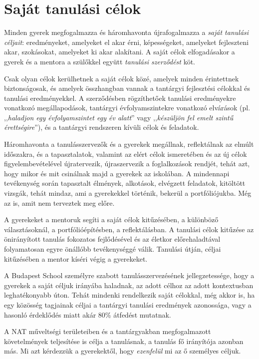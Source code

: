 \section{Saját tanulási célok}
\label{sec:tanulasi_celok}

Minden gyerek megfogalmazza és háromhavonta újrafogalmazza a \emph{saját tanulási céljait}: eredményeket, amelyeket el akar érni, képességeket, amelyeket fejleszteni akar, szokásokat, amelyeket ki akar alakítani. A saját célok elfogadásakor a gyerek és a mentora a szülőkkel együtt \emph{tanulási szerződést} köt.

Csak olyan célok kerülhetnek a saját célok közé, amelyek minden érintettnek biztonságosak, és amelyek összhangban vannak a tantárgyi fejlesztési célokkal és tanulási eredményekkel. A szerződésben rögzíthetőek tanulási eredményekre vonatkozó megállapodások, tantárgyi évfolyamszintekre vonatkozó elvárások (pl. ,,\emph{haladjon egy évfolyamszintet egy év alatt}'' vagy ,,\emph{készüljön fel emelt szintű érettségire}''), és a tantárgyi rendszeren kívüli célok és feladatok.


Háromhavonta a tanulásszervezők és a gyerekek megállnak, reflektálnak az elmúlt időszakra, és a tapasztalatok, valamint az elért célok ismeretében és az új célok figyelembevételével újratervezik, újraszervezik a foglalkozások rendjét, tehát azt, hogy mikor és mit csinálnak majd a gyerekek az iskolában. A mindennapi tevékenység során tapasztalt élmények, alkotások, elvégzett feladatok, kitöltött vizsgák, tehát mindaz, ami a gyerekekkel történik, bekerül a portfóliójukba. Még az is, amit nem terveztek meg előre.

A gyerekeket a mentoruk segíti a saját célok kitűzésében, a különböző választásoknál, a portfólióépítésben, a reflektálásban. A tanulási célok kitűzése az önirányított tanulás fokozatos fejlődésével és az életkor előrehaladtával folyamatosan egyre önállóbb tevékenységgé válik. Tanulási útján, céljai kitűzésében a mentor kíséri végig a gyerekeket.

A Budapest School személyre szabott tanulásszervezésének jellegzetessége, hogy a gyerekek a saját céljuk irányába haladnak, az adott célhoz az adott kontextusban leghatékonyabb úton. Tehát mindenki rendelkezik saját célokkal, még akkor is, ha egy közösség tagjainak céljai a tantárgyi tanulási eredmények azonossága, vagy a hasonló érdeklődés miatt akár  80\% átfedést mutatnak.

A NAT műveltségi területeiben és a tantárgyakban megfogalmazott követelmények teljesítése is célja a tanulásnak, a tanulás fő irányítója azonban más. Mi azt kérdezzük a gyerekektől, hogy \emph{ezenfelül} mi az ő személyes céljuk.